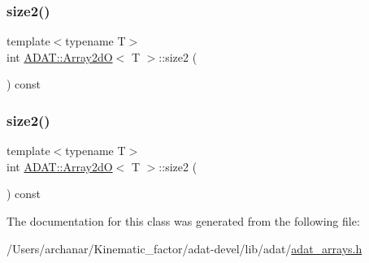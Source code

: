 \mbox{\label{classADAT_1_1Array2dO_a0e743678b1d8c06547715d8929c9b2bf}} 
\subsubsection{\texorpdfstring{size2()}{size2()}\hspace{0.1cm}{\footnotesize\ttfamily [2/3]}}
{\footnotesize\ttfamily template$<$typename T$>$ \\
int \mbox{\hyperlink{classADAT_1_1Array2dO}{A\+D\+A\+T\+::\+Array2dO}}$<$ T $>$\+::size2 (\begin{DoxyParamCaption}{ }\end{DoxyParamCaption}) const\hspace{0.3cm}{\ttfamily [inline]}}

\mbox{\label{classADAT_1_1Array2dO_a0e743678b1d8c06547715d8929c9b2bf}} 
\subsubsection{\texorpdfstring{size2()}{size2()}\hspace{0.1cm}{\footnotesize\ttfamily [3/3]}}
{\footnotesize\ttfamily template$<$typename T$>$ \\
int \mbox{\hyperlink{classADAT_1_1Array2dO}{A\+D\+A\+T\+::\+Array2dO}}$<$ T $>$\+::size2 (\begin{DoxyParamCaption}{ }\end{DoxyParamCaption}) const\hspace{0.3cm}{\ttfamily [inline]}}



The documentation for this class was generated from the following file\+:\begin{DoxyCompactItemize}
\item 
/\+Users/archanar/\+Kinematic\+\_\+factor/adat-\/devel/lib/adat/\mbox{\hyperlink{adat-devel_2lib_2adat_2adat__arrays_8h}{adat\+\_\+arrays.\+h}}\end{DoxyCompactItemize}
